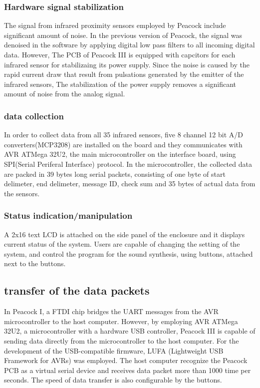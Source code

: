 \documentclass{nime-alternate}
\begin{document}
\subsubsection{Hardware signal stabilization} %
The signal from infrared proximity sensors employed by Peacock include significant amount of noise. In the previous version of Peacock, the signal was denoised in the software by applying digital low pass filters to all incoming digital data. However, The PCB of Peacock III is equipped with capcitors for each infrared sensor for stabilizaing its power supply. Since the noise is caused by the rapid current draw that result from pulsations generated by the emitter of the infrared sensors, The stabilization of the power supply removes a significant amount of noise from the analog signal.

\subsubsection{data collection} %
In order to collect data from all 35 infrared sensors, five 8 channel 12 bit A/D converters(MCP3208) are installed on the board and they communicates with AVR ATMega 32U2, the main microcontroller on the interface board, using SPI(Serial Periferal Interface) protocol. In the microcontroller, the collected data are packed in 39 bytes long serial packets, consisting of one byte of start delimeter, end delimeter, message ID, check sum and 35 bytes of actual data from the sensors.

\subsubsection{Status indication/manipulation} %

A 2x16 text LCD is attached on the side panel of the enclosure and it displays current status of the system. Users are capable of changing the setting of the system, and control the program for the sound synthesis, using buttons, attached next to the buttons.

\subsection{transfer of the data packets} %

In Peacock I, a FTDI chip bridges the UART messages from the AVR microcontroller to the host computer.
However, by employing AVR ATMega 32U2, a microcontroller with a hardware USB controller, Peacock III is capable of sending data directly from the microcontroller to the host computer. For the development of the USB-compatible firmware, LUFA (Lightweight USB Framework for AVRs)\cite{camera:lufa} was employed. The host computer recognize the Peacock PCB as a virtual serial device and receives data packet more than 1000 time per seconds. The speed of data transfer is also configurable by the buttons.
\end{document}
